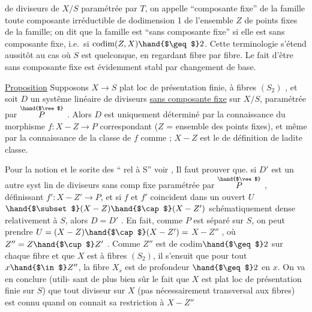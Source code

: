 
de diviseurs de $X/S$ paramétrée par $T$, on appelle ``composante fixe'' de la
famille toute composante irréductible de dodimension 1 de l'ensemble $Z$ de
points fixes de la famille; on dit que la famille est ``sans composante
fixe'' si elle est sans composante fixe, i.e.\ si $\operatorname{codim}(Z,X) \hand{$\geq$} 2$. Cette
terminologie s'étend aussitôt au cas où $S$ est quelconque, en regardant
fibre par fibre. Le fait d'être sans composante fixe est évidemment stabl
par changement de base.

\uline{Proposition} \hand{/}Supposons $X \longrightarrow S$ plat loc de présentation finie, à fibres
$(S_2)$ , et soit $D$ un systême linéaire de diviseurs \uline{sans composante fixe}
sur $X/S$, paramétrée par $\overset{\hand{$\vee$}}{P}$ . Alors $D$ est uniquement déterminé par la
connaissance du morphisme $f: X - Z \longrightarrow P$ correspondant ($Z$ = ensemble
des points fixes), et même par la connaissance de la classe de $f$ comme
  ; $X-Z$ est le 
de définition de ladite classe.

Pour la notion et le sorite des ``
rel à S'' voir  ,  Il faut prouver que.
si  $D'$ est un
autre syst lin de diviseurs sans comp fixe paramétrée par $\overset{\hand{$\vee$}}{P}$ , 
définissant $f': X-Z' \longrightarrow P$, et si $f$ et $f'$ coincident dans un ouvert $U$
$\hand{$\subset$} (X-Z)\hand{$\cap$}(X-Z')$ schématiquement dense relativement à $S$, alors $D=D'$ .
En fait, comme $P$ est séparé sur $S$, on peut prendre $U=(X-Z)\hand{$\cap$}(X-Z') =$
 $X-Z''$ , où $Z'' = Z\hand{$\cup$}Z'$ . Comme $Z''$ est de codim$\hand{$\geq$}2$
sur chaque fibre et que $X$ est à fibres $(S_2)$, il s'ensuit que pour tout
$x\hand{$\in$} Z''$, la fibre $X_s$ est de profondeur $\hand{$\geq$}2$ en $x$. On va en conclure (utili-%
sant de plus bien sûr le fait que $X$ est plat loc de présentation finie
sur $S$) que tout diviseur  sur $X$ (pas nécessairement 
transversal aux fibres) est connu quand on connait sa restriction à $X-Z''$

